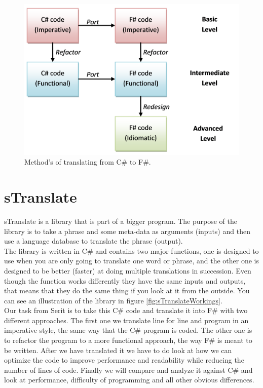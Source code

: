 \documentclass[12pt, a4paper]{article}
\begin{document}
\begin{figure}[!h]
    \includegraphics[scale=0.6]{image01}
    \centering
    \caption{Method's of translating from C\# to F\#.}
\end{figure}



\newpage

\section{sTranslate}
sTranslate is a library that is part of a bigger program. The purpose of the library is to take a phrase and some meta-data as arguments (inputs) and then use a language database to translate the phrase (output).\\

The library is written in C\# and contains two major functions, one is designed to use when you are only going to translate one word or phrase, and the other one is designed to be better (faster) at doing multiple translations in succession. Even though the function works differently they have the same inputs and outputs, that means that they do the same thing if you look at it from the outside. You can see an illustration of the library in figure \ref{fig:sTranslateWorkings}.\\


Our task from Serit is to take this C\# code and translate it into F\# with two different approaches. The first one we translate line for line and program in an imperative style, the same way that the C\# program is coded. The other one is to refactor the program to a more functional approach, the way F\# is meant to be written. After we have translated it we have to do look at how we can optimize the code to improve performance and readability while reducing the number of lines of code. Finally we will compare and analyze it against C\# and look at performance, difficulty of programming and all other obvious differences.\\
\end{document}
